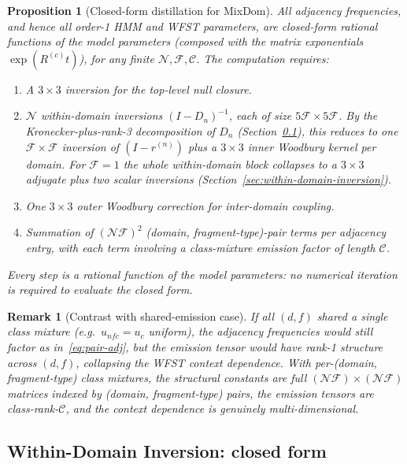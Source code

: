 \documentclass{article}
\newtheorem{proposition}{Proposition}
\newtheorem{remark}{Remark}
\newcommand\ext{r}
\newcommand\dom{n}
\newcommand\ndom{\mathcal{N}}
\newcommand\nfrag{\mathcal{F}}
\newcommand\classdist{u}
\providecommand\revsub{R}
\newcommand\evoltime{t}
\newcommand\frag{f}
\newcommand\class{c}
\newcommand\nclasses{\mathcal{C}}
\begin{document}
\begin{proposition}[Closed-form distillation for MixDom]
All adjacency frequencies, and hence all order-1 HMM and WFST
parameters, are closed-form rational functions of the model parameters
(composed with the matrix exponentials $\exp(\revsub^{(\class)}\evoltime)$),
for any finite $\ndom, \nfrag, \nclasses$.
The computation requires:
\begin{enumerate}
\item A $3 \times 3$ inversion for the top-level null closure.
\item $\ndom$ within-domain inversions $(I - D_\dom)^{-1}$, each of size
  $5\nfrag \times 5\nfrag$. By the Kronecker-plus-rank-3 decomposition
  of $D_\dom$ (Section~\ref{sec:within-domain-mixdom}), this reduces
  to one $\nfrag \times \nfrag$ inversion of
  $(I - \ext^{(\dom)})$ plus a $3 \times 3$ inner Woodbury kernel per
  domain. For $\nfrag = 1$ the whole within-domain block collapses to a
  $3 \times 3$ adjugate plus two scalar inversions
  (Section~\ref{sec:within-domain-inversion}).
\item One $3 \times 3$ outer Woodbury correction for inter-domain coupling.
\item Summation of $(\ndom\nfrag)^2$ (domain, fragment-type)-pair terms
  per adjacency entry, with each term involving a class-mixture
  emission factor of length $\nclasses$.
\end{enumerate}
Every step is a rational function of the model parameters: no
numerical iteration is required to evaluate the closed form.
\end{proposition}

\begin{remark}[Contrast with shared-emission case]
If all $(d,f)$ shared a single class mixture (e.g.\
$\classdist_{\dom\frag\class} = u_\class$ uniform), the adjacency
frequencies would still factor as in~\eqref{eq:pair-adj}, but the
emission tensor would have rank-1 structure across $(d,f)$, collapsing
the WFST context dependence. With per-(domain, fragment-type) class
mixtures, the structural constants are full
$(\ndom\nfrag) \times (\ndom\nfrag)$ matrices indexed by
(domain, fragment-type) pairs, the emission tensors are
class-rank-$\nclasses$, and the context dependence is genuinely
multi-dimensional.
\end{remark}


\subsection{Within-Domain Inversion: closed form}
\label{sec:within-domain-mixdom}
\end{document}

